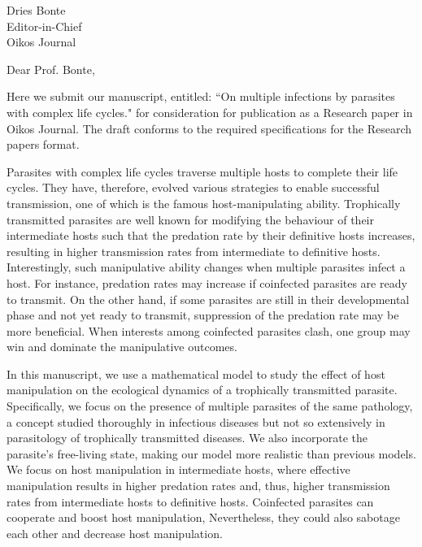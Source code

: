 \documentclass[10,DIN, pagenumber=false, parskip=half,fromalign=right, fromphone=false,fromemail=true, fromurl=false,fromlogo=true, fromrule=false]{scrlttr2}
\begin{document}
\sffamily

\begin{letter}{
\sffamily
\vspace{-0.4cm}
Dries Bonte \\
Editor-in-Chief\\
Oikos Journal
}
\opening{\sffamily \vspace{-1cm} Dear Prof. Bonte,}
\vspace{-0.3cm}

Here we submit our manuscript, entitled: ``On multiple infections by parasites with complex life cycles." for consideration for publication as a Research paper in Oikos Journal. 
The draft conforms to the required specifications for the Research papers format.

Parasites with complex life cycles traverse multiple hosts to complete their life cycles.
They have, therefore, evolved various strategies to enable successful transmission, one of which is the famous host-manipulating ability.
Trophically transmitted parasites are well known for modifying the behaviour of their intermediate hosts such that the predation rate by their definitive hosts increases, resulting in higher transmission rates from intermediate to definitive hosts.
Interestingly, such manipulative ability changes when multiple parasites infect a host. 
For instance, predation rates may increase if coinfected parasites are ready to transmit. 
On the other hand, if some parasites are still in their developmental phase and not yet ready to transmit, suppression of the predation rate may be more beneficial.
When interests among coinfected parasites clash, one group may win and dominate the manipulative outcomes.

In this manuscript, we use a mathematical model to study the effect of host manipulation on the ecological dynamics of a trophically transmitted parasite.
Specifically, we focus on the presence of multiple parasites of the same pathology, a concept studied thoroughly in infectious diseases but not so extensively in parasitology of trophically transmitted diseases.
We also incorporate the parasite's free-living state, making our model more realistic than previous models.
We focus on host manipulation in intermediate hosts, where effective manipulation results in higher predation rates and, thus, higher transmission rates from intermediate hosts to definitive hosts.
Coinfected parasites can cooperate and boost host manipulation,
Nevertheless, they could also sabotage each other and decrease host manipulation.


\end{letter}
\end{document}
